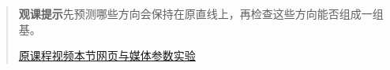 \begin{quote}\small\textbf{观课提示}\quad 先预测哪些方向会保持在原直线上，再检查这些方向能否组成一组基。

\href{https://www.youtube.com/watch?v=PFDu9oVAE-g}{原课程视频}\quad\href{https://vitael04213.github.io/3blue1brown-notes/lessons/eigenvalues.html}{本节网页与媒体}\quad\href{https://vitael04213.github.io/3blue1brown-notes/lab.html\#eigen}{参数实验}
\end{quote}
